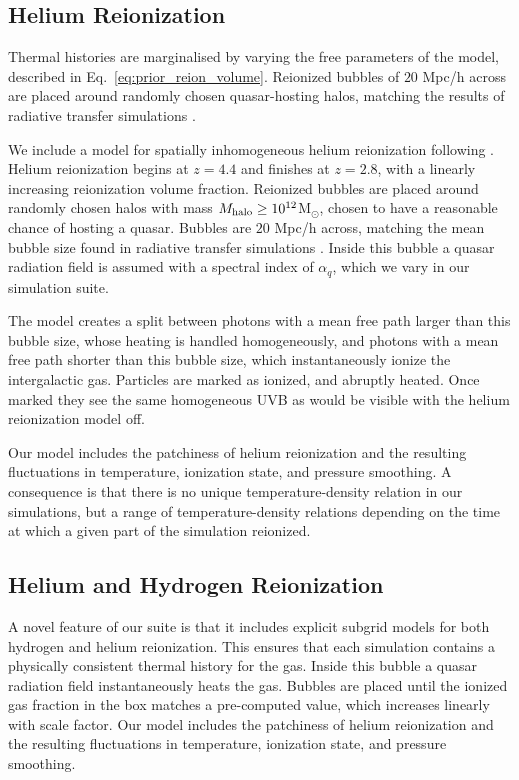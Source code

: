 \documentclass[a4paper,11pt]{article}
\begin{document}
\subsection{Helium Reionization}
\label{sec:helium}

Thermal histories are marginalised by varying the free parameters of the model, described in Eq.~\ref{eq:prior_reion_volume}. Reionized bubbles of $20$ Mpc/h across are placed around randomly chosen quasar-hosting halos, matching the results of radiative transfer simulations \citep{McQuinn:2009}.

We include a model for spatially inhomogeneous helium reionization following \cite{UptonSanderbeck:2020}. Helium reionization begins at $z=4.4$ and finishes at $z=2.8$, with a linearly increasing reionization volume fraction. Reionized bubbles are placed around randomly chosen halos with mass $M_{\rm halo}\geq 10^{12}$M$_{\odot}$, chosen to have a reasonable chance of hosting a quasar. Bubbles are $20$ Mpc/h across, matching the mean bubble size found in radiative transfer simulations \citep{McQuinn:2009}. Inside this bubble a quasar radiation field is assumed with a spectral index of $\alpha_q$, which we vary in our simulation suite.

The model creates a split between photons with a mean free path larger than this bubble size, whose heating is handled homogeneously, and photons with a mean free path shorter than this bubble size, which instantaneously ionize the intergalactic gas. Particles are marked as ionized, and abruptly heated. Once marked they see the same homogeneous UVB as would be visible with the helium reionization model off.

Our model includes the patchiness of helium reionization and the resulting fluctuations in temperature, ionization state, and pressure smoothing. A consequence is that there is no unique temperature-density relation in our simulations, but a range of temperature-density relations depending on the time at which a given part of the simulation reionized.

\subsection{Helium and Hydrogen Reionization}
\label{sec:helium}

A novel feature of our suite is that it includes explicit subgrid models for both hydrogen and helium reionization. This ensures that each simulation contains a physically consistent thermal history for the gas.  Inside this bubble a quasar radiation field instantaneously heats the gas.
Bubbles are placed until the ionized gas fraction in the box matches a pre-computed value, which increases linearly with scale factor.  Our model includes the patchiness of helium reionization and the resulting fluctuations in temperature, ionization state, and pressure smoothing. %
\end{document}
